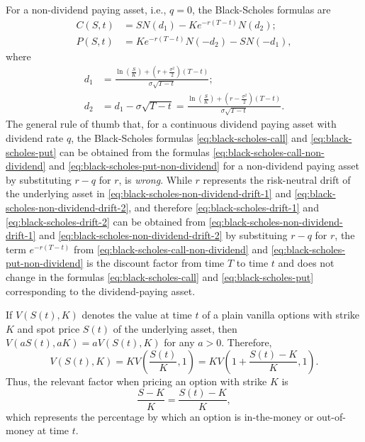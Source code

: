 For a non-dividend paying asset, i.e., $ q = 0 $, the Black-Scholes formulas are
\begin{align}
    C(S, t) &= S N(d_1) - Ke^{-r (T - t)} N(d_2);
    \label{eq:black-scholes-call-non-dividend} \\
    P(S, t) &= K e^{-r (T - t)} N(-d_2) - S N(-d_1),
    \label{eq:black-scholes-put-non-dividend}
\end{align}
where
\begin{align}
    d_1 &= \frac{\ln \left( \frac{S}{K} \right) + \left( r +
        \frac{\sigma^2}{2} \right) (T - t)}{\sigma \sqrt{T - t}};
    \label{eq:black-scholes-non-dividend-drift-1} \\
    d_2 &= d_1 - \sigma \sqrt{T - t} = \frac{\ln \left( \frac{S}{K} \right) +
        \left( r - \frac{\sigma^2}{2} \right) (T - t)}{\sigma \sqrt{T - t}}.
    \label{eq:black-scholes-non-dividend-drift-2}
\end{align}
The general rule of thumb that, for a continuous dividend paying asset with
    dividend rate $ q $, the Black-Scholes formulas
    \eqref{eq:black-scholes-call} and \eqref{eq:black-scholes-put} can be
    obtained from the formulas \eqref{eq:black-scholes-call-non-dividend} and
    \eqref{eq:black-scholes-put-non-dividend} for a non-dividend paying asset
    by substituting $ r - q $ for $ r $, is \textit{wrong}.
While $ r $ represents the risk-neutral drift of the underlying asset in
    \eqref{eq:black-scholes-non-dividend-drift-1} and
    \eqref{eq:black-scholes-non-dividend-drift-2}, and therefore
    \eqref{eq:black-scholes-drift-1} and \eqref{eq:black-scholes-drift-2} can be
    obtained from \eqref{eq:black-scholes-non-dividend-drift-1} and
    \eqref{eq:black-scholes-non-dividend-drift-2} by substituing $ r - q $ for
    $ r $, the term $ e^{-r (T - t)} $ from
    \eqref{eq:black-scholes-call-non-dividend} and
    \eqref{eq:black-scholes-put-non-dividend} is the discount factor from time
    $ T $ to time $ t $ and does not change in the formulas
    \eqref{eq:black-scholes-call} and \eqref{eq:black-scholes-put} corresponding
    to the dividend-paying asset.

If $ V(S(t), K) $ denotes the value at time $ t $ of a plain vanilla options
    with strike $ K $ and spot price $ S(t) $ of the underlying asset, then
    $ V(a S(t), a K) = a V(S(t), K) $ for any $ a > 0 $.
Therefore,
\begin{equation*}
    V(S(t), K) = K V \left( \frac{S(t)}{K}, 1 \right) = K V \left( 1 +
        \frac{S(t) - K}{K}, 1 \right).
\end{equation*}
Thus, the relevant factor when pricing an option with strike $ K $ is
\begin{equation*}
    \frac{S - K}{K} = \frac{S(t) - K}{K},
\end{equation*}
which represents the percentage by which an option is in-the-money or
    out-of-money at time $ t $.

